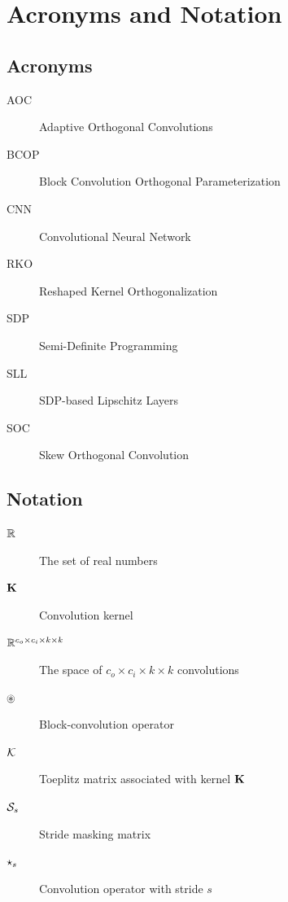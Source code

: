 \chapter*{Acronyms and Notation}

\section*{Acronyms}
\begin{description}
    \item[AOC] Adaptive Orthogonal Convolutions
    \item[BCOP] Block Convolution Orthogonal Parameterization
    \item[CNN] Convolutional Neural Network
    \item[RKO] Reshaped Kernel Orthogonalization
    \item[SDP] Semi-Definite Programming
    \item[SLL] SDP-based Lipschitz Layers
    \item[SOC] Skew Orthogonal Convolution
\end{description}

\section*{Notation}
\begin{description}
    \item[$\mathbb{R}$] The set of real numbers
    \item[$\mathbf{K}$] Convolution kernel
    \item[$\mathbb{R}^{c_o\times c_i\times k\times k}$] The space of $c_o \times c_i \times k \times k$ convolutions
    \item[$\circledast$] Block-convolution operator
    \item[$\mathcal{K}$] Toeplitz matrix associated with kernel $\mathbf{K}$
    \item[$\mathcal{S}_{s}$] Stride masking matrix
    \item[$\star_{s}$] Convolution operator with stride $s$
\end{description}
